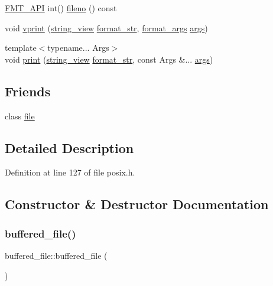 \begin{DoxyCompactItemize}
\hyperlink{core_8h_a9a4960b70582ed2620911a0b75dce0b5}{F\+M\+T\+\_\+\+A\+PI} int() \hyperlink{classbuffered__file_ab86229c986f9598cf523ce2a026b750c}{fileno} () const
\item 
void \hyperlink{classbuffered__file_a0a34fceffc31cc126a6b731461c88d8d}{vprint} (\hyperlink{core_8h_a17e3ff7f9ac2b8f068f719b829890036}{string\+\_\+view} \hyperlink{format_8h_aa2b402011ee0619f2158f13e0827e585}{format\+\_\+str}, \hyperlink{structformat__args}{format\+\_\+args} \hyperlink{printf_8h_a47047b7b28fd1342eef756b79c778580}{args})
\item 
{\footnotesize template$<$typename... Args$>$ }\\void \hyperlink{classbuffered__file_ad97c4521f94be51a5b30064803e2bef1}{print} (\hyperlink{core_8h_a17e3ff7f9ac2b8f068f719b829890036}{string\+\_\+view} \hyperlink{format_8h_aa2b402011ee0619f2158f13e0827e585}{format\+\_\+str}, const Args \&... \hyperlink{printf_8h_a47047b7b28fd1342eef756b79c778580}{args})
\end{DoxyCompactItemize}
\subsection*{Friends}
\begin{DoxyCompactItemize}
\item 
class \hyperlink{classbuffered__file_a686a90482e62dd1618201a3c79f9aae6}{file}
\end{DoxyCompactItemize}


\subsection{Detailed Description}


Definition at line 127 of file posix.\+h.



\subsection{Constructor \& Destructor Documentation}
\mbox{\label{classbuffered__file_ab89aef2bb026cd34b3e8596fe8be52eb}} 
\subsubsection{\texorpdfstring{buffered\+\_\+file()}{buffered\_file()}\hspace{0.1cm}{\footnotesize\ttfamily [1/3]}}
{\footnotesize\ttfamily buffered\+\_\+file\+::buffered\+\_\+file (\begin{DoxyParamCaption}{ }\end{DoxyParamCaption})\hspace{0.3cm}{\ttfamily [inline]}}



